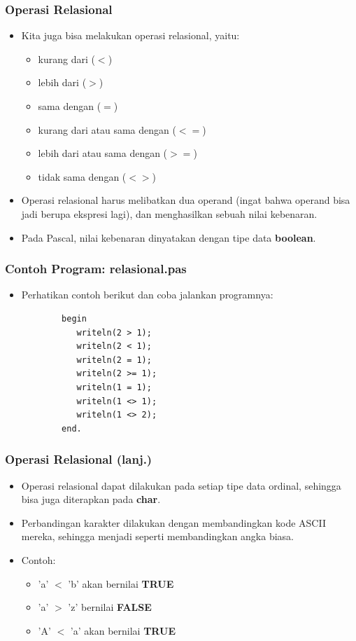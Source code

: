 \documentclass{beamer}
\begin{document}
\begin{frame}
\frametitle{Operasi Relasional}
\begin{itemize}
	\item Kita juga bisa melakukan operasi relasional, yaitu:
	\begin{itemize}
		\item kurang dari ($<$)
		\item lebih dari ($>$)
		\item sama dengan ($=$)
		\item kurang dari atau sama dengan ($<=$)
		\item lebih dari atau sama dengan ($>=$)
		\item tidak sama dengan ($<>$)
	\end{itemize}
	\item Operasi relasional harus melibatkan dua operand (ingat bahwa operand bisa jadi berupa ekspresi lagi), dan menghasilkan sebuah nilai kebenaran. 
	\item Pada Pascal, nilai kebenaran dinyatakan dengan tipe data \alert{\textbf{boolean}}.
\end{itemize}
\end{frame}

\begin{frame}[fragile]
\frametitle{Contoh Program: relasional.pas}
\begin{itemize}
	\item Perhatikan contoh berikut dan coba jalankan programnya:
	\begin{lstlisting}
		begin
		   writeln(2 > 1);
		   writeln(2 < 1);
		   writeln(2 = 1);
		   writeln(2 >= 1);
		   writeln(1 = 1);
		   writeln(1 <> 1);
		   writeln(1 <> 2);
		end.
	\end{lstlisting}
\end{itemize}
\end{frame}

\begin{frame}
\frametitle{Operasi Relasional (lanj.)}
\begin{itemize}
	\item Operasi relasional dapat dilakukan pada setiap tipe data ordinal, sehingga bisa juga diterapkan pada \textbf{char}.
	\item Perbandingan karakter dilakukan dengan membandingkan kode ASCII mereka, sehingga menjadi seperti membandingkan angka biasa.
	\item Contoh:
	\begin{itemize}
		\item 'a' $<$ 'b' akan bernilai \textbf{TRUE}
		\item 'a' $>$ 'z' bernilai \textbf{FALSE}
		\item 'A' $<$ 'a' akan bernilai \textbf{TRUE}
	\end{itemize}
\end{itemize}
\end{frame}
\end{document}
